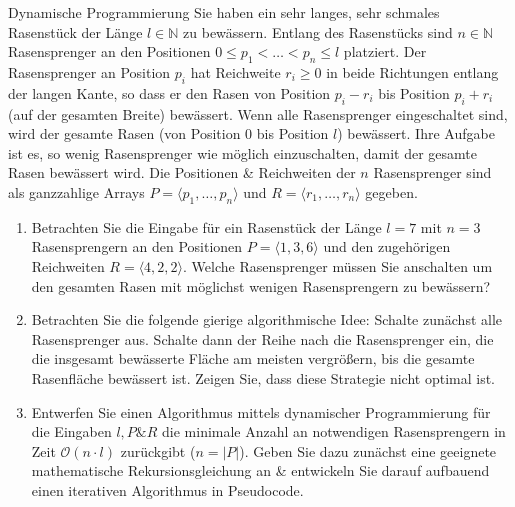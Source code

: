 \documentclass{article}
\begin{document}
\begin{exercise}{Dynamische Programmierung}
  Sie haben ein sehr langes, sehr schmales Rasenstück der Länge $l \in \mathbb{N}$ zu bewässern. Entlang des Rasenstücks sind $n \in \mathbb{N}$ Rasensprenger an den Positionen $0 \leq p_1 < \ldots < p_n \leq l$ platziert. Der Rasensprenger an Position $p_i$ hat Reichweite $r_i \geq 0$ in beide Richtungen entlang der langen Kante, so dass er den Rasen von Position $p_i - r_i$ bis Position $p_i + r_i$ (auf der gesamten Breite) bewässert. Wenn alle Rasensprenger eingeschaltet sind, wird der gesamte Rasen (von Position 0 bis Position $l$) bewässert. Ihre Aufgabe ist es, so wenig Rasensprenger wie möglich einzuschalten, damit der gesamte Rasen bewässert wird. Die Positionen \& Reichweiten der $n$ Rasensprenger sind als ganzzahlige Arrays $P = \langle p_1, \ldots, p_n \rangle$ und $R = \langle r_1, \ldots, r_n \rangle$ gegeben.
  \begin{enumerate}
    \item Betrachten Sie die Eingabe für ein Rasenstück der Länge $l = 7$ mit $n = 3$ Rasensprengern an den Positionen $P = \langle 1,3,6 \rangle$ und den zugehörigen Reichweiten $R = \langle 4,2,2 \rangle$. Welche Rasensprenger müssen Sie anschalten um den gesamten Rasen mit möglichst wenigen Rasensprengern zu bewässern?
    \item Betrachten Sie die folgende gierige algorithmische Idee: Schalte zunächst alle Rasensprenger aus. Schalte dann der Reihe nach die Rasensprenger ein, die die insgesamt bewässerte Fläche am meisten vergrößern, bis die gesamte Rasenfläche bewässert ist. Zeigen Sie, dass diese Strategie nicht optimal ist.
    \item Entwerfen Sie einen Algorithmus mittels dynamischer Programmierung für die Eingaben $l, P \& R$ die minimale Anzahl an notwendigen Rasensprengern in Zeit $\mathcal{O}(n \cdot l)$ zurückgibt ($n = \lvert P \rvert$). Geben Sie dazu zunächst eine geeignete mathematische Rekursionsgleichung an \& entwickeln Sie darauf aufbauend einen iterativen Algorithmus in Pseudocode.
  \end{enumerate}
\end{exercise}
\end{document}
